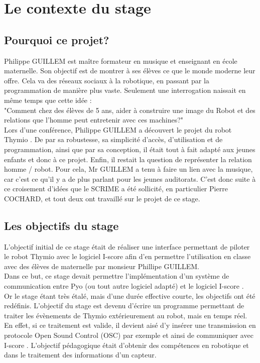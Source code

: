 \documentclass[a4paper, 12pt]{report}
\begin{document}
\section{Le contexte du stage}
\subsection{Pourquoi ce projet?}

Philippe GUILLEM est maître formateur en musique et enseignant en école maternelle. Son objectif est de montrer à ses élèves ce que le monde moderne leur offre. Cela va des réseaux sociaux à la robotique, en passant par la programmation de manière plus vaste. Seulement une interrogation naissait en même temps que cette idée :\\

"Comment chez des élèves de 5 ans, aider à construire une image du Robot et des relations que l'homme peut entretenir avec ces machines?" \cite{FragClasseThymio}\\

Lors d'une conférence, Philippe GUILLEM a découvert le projet du robot Thymio \pageref{thymio}. De par sa robustesse, sa simplicité d'accès, d'utilisation et de programmation, ainsi que par sa conception, il était tout à fait adapté aux jeunes enfants et donc à ce projet.
Enfin, il restait la question de représenter la relation homme / robot. Pour cela, Mr GUILLEM a tenu à faire un lien avec la musique, car c'est ce qu'il y a de plus parlant pour les jeunes auditorats. C'est donc suite à ce croisement d'idées que le SCRIME a été sollicité, en particulier Pierre COCHARD, et tout deux ont travaillé sur le projet de ce stage.


\subsection{Les objectifs du stage}
L'objectif initial de ce stage était de réaliser une interface permettant de piloter le robot Thymio \pageref{thymio} avec le logiciel I-score \cite{ISCORE} afin d'en permettre l'utilisation en classe avec des élèves de maternelle par monsieur Phillipe GUILLEM. \\
Dans ce but, ce stage devait permettre l'implémentation d'un système de communication entre Pyo \cite{PYO2016} (ou tout autre logiciel adapté) et le logiciel I-score \cite{ISCORE}.\\
Or le stage étant très étalé, mais d'une durée effective courte, les objectifs ont été redéfinis. L'objectif du stage est devenu d'écrire un programme permettant de traiter les évènements de Thymio extérieurement au robot, mais en temps réel. En effet, si ce traitement est valide, il devient aisé d'y insérer une transmission en protocole Open Sound Control (OSC) \cite{OSC2016} par exemple et ainsi de communiquer avec I-score  \cite{ISCORE}.
L'objectif pédagogique était d'obtenir des compétences en robotique et dans le traitement des informations d'un capteur. 
\end{document}
